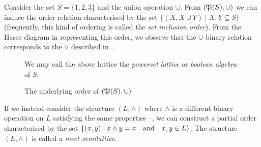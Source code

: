 \begin{example}
	\label{example:power-set-lattice} Consider the set $S = \{1,2,3\}$ and the union operation $\cup$. From
	$(\mathfrak{P}({S}), \cup)$ we can induce the order relation characterised by the set $\{(X, X \cup Y) \mid X,Y \subseteq S \}$
	(frequently, this kind of ordering is called the \textit{set inclusion order}). From the Hasse diagram in 
	representing this order, we observe that the $\cup$ binary relation corresponds to the $\vee$ described in
	.
	\begin{figure}[H]
		\centering
		\caption{The underlying order of $(\mathfrak{P}({S}), \cup)$}
		\label{figure:set-inclusion-order}

		We may call the above lattice the \textit{powerset lattice} or \textit{boolean algebra} of $S$. 
	\end{figure}
\end{example}

If we instead consider the structure $(L, \wedge)$ where $\wedge$ is a different binary operation on $L$ satisfying the same
properties --, we can construct a partial order characterised by the set $\{(
x,y) \mid x \wedge y = x \quad \text{and} \quad x,y \in L\}$. The structure $(L, \wedge)$ is called a \textit{meet semilattice}.

